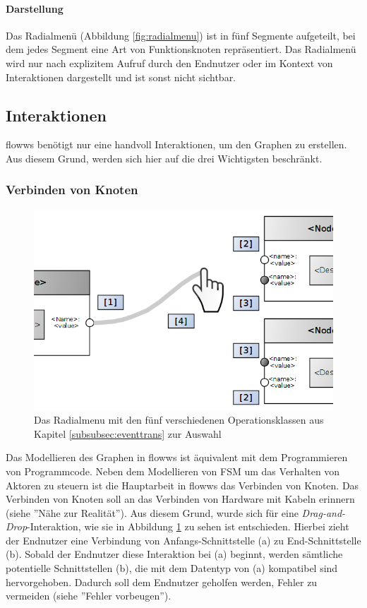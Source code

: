 \paragraph{Darstellung} Das Radialmenü (Abbildung \ref{fig:radialmenu}) ist in fünf Segmente aufgeteilt, bei dem jedes Segment eine Art von Funktionsknoten repräsentiert. Das Radialmenü wird nur nach explizitem Aufruf durch den Endnutzer oder im Kontext von Interaktionen dargestellt und ist sonst nicht sichtbar. 

\subsection{Interaktionen}

flowws benötigt nur eine handvoll Interaktionen, um den Graphen zu erstellen. Aus diesem Grund, werden sich hier auf die drei Wichtigsten beschränkt. %

\subsubsection{Verbinden von Knoten}

\begin{figure}[h]
  \centering
  \includegraphics[width=.75\textwidth]{bilder/chapter4/chapter4_3/connectNodes.png}
  \caption{Das Radialmenu mit den fünf verschiedenen Operationsklassen aus Kapitel \ref{subsubsec:eventtrans} zur Auswahl}
  \label{fig:connectNodesInteraction}
\end{figure}
Das Modellieren des Graphen in flowws ist äquivalent mit dem Programmieren von Programmcode. Neben dem Modellieren von \ac{FSM} um das Verhalten von Aktoren zu steuern ist die Hauptarbeit in flowws das Verbinden von Knoten. Das Verbinden von Knoten soll an das Verbinden von Hardware mit Kabeln erinnern (siehe ''Nähe zur Realität''). Aus diesem Grund, wurde sich für eine \textit{Drag-and-Drop}-Interaktion, wie sie in Abbildung \ref{fig:connectNodesInteraction} zu sehen ist entschieden. Hierbei zieht der Endnutzer eine Verbindung von Anfangs-Schnittstelle (a) zu End-Schnittstelle (b). Sobald der Endnutzer diese Interaktion bei (a) beginnt, werden sämtliche potentielle Schnittstellen (b), die mit dem Datentyp von (a) kompatibel sind hervorgehoben. Dadurch soll dem Endnutzer geholfen werden, Fehler zu vermeiden (siehe ''Fehler vorbeugen'').

